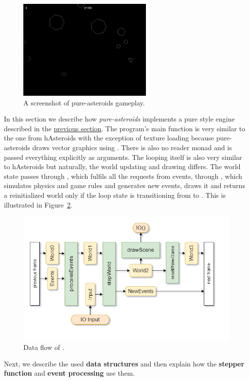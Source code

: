 \documentclass[
  digital, %
  color,   %
  table,   %
  oneside, %
  lof,     %
  lot,     %
]{fithesis3}
\begin{document}
\begin{figure}[hbt!]
    \centering
    \includegraphics[height=5cm]{images/pure-screenshot.png}
    \caption{A screenshot of pure-asteroids gameplay.}
    \label{fig:pureasteroidsscreenshot}
\end{figure}

In this section we describe how \emph{pure-asteroids} implements a pure style engine described
in the \hyperref[sect:pureengines]{previous section}.
The program's main function is very similar to the one from
hAsteroids with the exception of texture loading because pure-asteroids
draws vector graphics using . There is also no reader monad
and  is passed everything explicitly as arguments.
The looping itself is also very similar to hAsteroids but naturally,
the world updating and drawing differs. The world state passes through
, which fulfils all the requests from events,
through , which simulates physics and game rules and generates new events,
 draws it and  returns a reinitialized
world only if the loop state is transitioning from  to .
This is illustrated in Figure~\ref{fig:worldeventsflow}.
\begin{figure}
    \centering
    \includegraphics[width=\textwidth]{images/world-flow-detailed.png}
    \caption{Data flow of .}
    \label{fig:worldeventsflow}
\end{figure}
Next, we describe the used \textbf{data structures} and then explain
how the \textbf{stepper function} and \textbf{event processing} use them.
\end{document}
